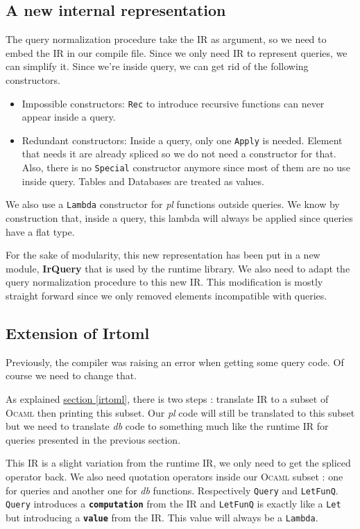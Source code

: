 \documentclass[11pt]{article}
\newcommand\mysc[1]{{\rmfamily\textsc{#1}}\xspace}
\newcommand\ocaml{\mysc{Ocaml}}
\newcommand\refsec[1]{\hyperref[#1]{section \ref*{#1}}}
\newcommand\sig[1]{{\tt\bf #1}}
\newcommand\effect[1]{{\em #1}}
\newcommand\ocamlc[1]{\lstinline[language={[Objective]Caml},basicstyle=\ttfamily\normalsize]{#1}}
\newcommand\module[1]{{\bf #1}}
\begin{document}
\subsection{A new internal representation}

The query normalization procedure take the IR as argument, so we need to embed the IR in our compile file. Since we only need IR to represent queries, we can simplify it. Since we're inside query, we can get rid of the following constructors.
\begin{itemize}
\item Impossible constructors: \ocamlc{Rec} to introduce recursive functions can never appear inside a query.
\item Redundant constructors: Inside a query, only one \ocamlc{Apply} is needed. Element that needs it are already spliced so we do not need a constructor for that. Also, there is no \ocamlc{Special} constructor anymore since most of them are no use inside query. Tables and Databases are treated as values.
\end{itemize}

We also use a \ocamlc{Lambda} constructor for \effect{pl} functions outside queries. We know by construction that, inside a query, this lambda will always be applied since queries have a flat type.

For the sake of modularity, this new representation has been put in a new module, \module{IrQuery} that is used by the runtime library. We also need to adapt the query normalization procedure to this new IR. This modification is mostly straight forward since we only removed elements incompatible with queries.

\subsection{Extension of \module{Irtoml}}

Previously, the compiler was raising an error when getting some query code. Of course we need to change that.

As explained \refsec{irtoml}, there is two steps : translate IR to a subset of \ocaml then printing this subset. Our \effect{pl} code will still be translated to this subset but we need to translate \effect{db} code to something much like the runtime IR for queries presented in the previous section.

This IR is a slight variation from the runtime IR, we only need to get the spliced operator back. We also need quotation operators inside our \ocaml subset : one for queries and another one for \effect{db} functions. Respectively \ocamlc{Query} and \ocamlc{LetFunQ}.\\
\ocamlc{Query} introduces a \sig{computation} from the IR and \ocamlc{LetFunQ} is exactly like a \ocamlc{Let} but introducing a \sig{value} from the IR. This value will always be a \ocamlc{Lambda}.\\
\end{document}

